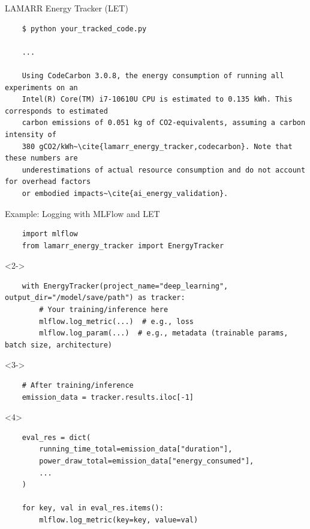 \begin{darkframe}[fragile]{LAMARR Energy Tracker (LET)}
  \begin{verbatim}
    $ python your_tracked_code.py

    ...

    Using CodeCarbon 3.0.8, the energy consumption of running all experiments on an
    Intel(R) Core(TM) i7-10610U CPU is estimated to 0.135 kWh. This corresponds to estimated
    carbon emissions of 0.051 kg of CO2-equivalents, assuming a carbon intensity of
    380 gCO2/kWh~\cite{lamarr_energy_tracker,codecarbon}. Note that these numbers are
    underestimations of actual resource consumption and do not account for overhead factors
    or embodied impacts~\cite{ai_energy_validation}.
  \end{verbatim}
\end{darkframe}

\begin{darkframe}[t,fragile]{Example: Logging with MLFlow and LET}
  \begin{verbatim}
    import mlflow
    from lamarr_energy_tracker import EnergyTracker

  \end{verbatim}

  \begin{onlyenv}<2->
  \begin{verbatim}
    with EnergyTracker(project_name="deep_learning", output_dir="/model/save/path") as tracker:
        # Your training/inference here
        mlflow.log_metric(...)  # e.g., loss
        mlflow.log_param(...)  # e.g., metadata (trainable params, batch size, architecture)

  \end{verbatim}
  \end{onlyenv}

  \begin{onlyenv}<3->
  \begin{verbatim}
    # After training/inference
    emission_data = tracker.results.iloc[-1]

  \end{verbatim}
  \end{onlyenv}

  \begin{onlyenv}<4>
  \begin{verbatim}
    eval_res = dict(
        running_time_total=emission_data["duration"],
        power_draw_total=emission_data["energy_consumed"],
        ...
    )

    for key, val in eval_res.items():
        mlflow.log_metric(key=key, value=val)
  \end{verbatim}
  \end{onlyenv}
\end{darkframe}

